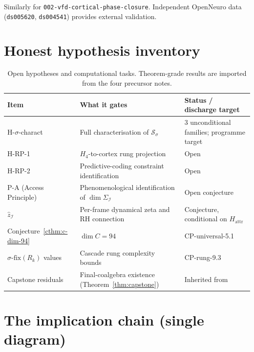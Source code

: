 \documentclass[11pt]{article}
\theoremstyle{plain}
\theoremstyle{definition}
\theoremstyle{remark}
\newcommand{\Ical}{\mathcal{I}}
\begin{document}
Similarly for \texttt{002-vfd-cortical-phase-closure}. Independent OpenNeuro data (\texttt{ds005620}, \texttt{ds004541}) provides external validation.

\section{Honest hypothesis inventory}\label{sec:hypothesis-inventory}

\begin{table}[h]
\centering
\small
\caption{Open hypotheses and computational tasks. Theorem-grade results are imported from the four precursor notes.}\label{tab:open-items}
\begin{tabular}{lp{4cm}l}
\toprule
Item & What it gates & Status / discharge target \\
\midrule
H-$\sigma$-charact & Full characterisation of $\mathcal{S}_\sigma$ & 3 unconditional families; programme target \\
H-RP-1 & $H_4$-to-cortex rung projection & Open \\
H-RP-2 & Predictive-coding constraint identification & Open \\
P-A (Access Principle) & Phenomenological identification of $\dim \Sigma_\Ical$ & Open conjecture \\
$\hat{z}_\Ical$ & Per-frame dynamical zeta and RH connection & Conjecture, conditional on $H_{\mathrm{attr}}$ \\
Conjecture~\ref{cthm:c-dim-94} & $\dim C = 94$ & CP-universal-5.1 \\
$\sigma\text{-fix}(R_k)$ values & Cascade rung complexity bounds & CP-rung-9.3 \\
Capstone residuals & Final-coalgebra existence (Theorem~\ref{thm:capstone}) & Inherited from \citet{SmartCapstone} \\
\bottomrule
\end{tabular}
\end{table}

\appendix

\section{The implication chain (single diagram)}\label{app:chain}
\end{document}
